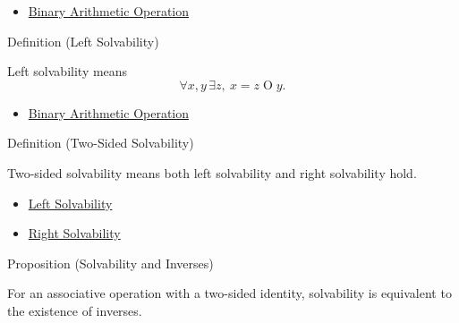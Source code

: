 \begin{dependencies}
\begin{itemize}
  \item \hyperref[def:binary-arithmetic-operation]{Binary Arithmetic Operation}
\end{itemize}
\end{dependencies}

\begin{definitionbox}{Definition (Left Solvability)}
\begin{definition}
\label{def:left-solvability}
Left solvability means
\[
\forall x,y\,\exists z,\ x=z\mathbin{O}y.
\]
\end{definition}
\end{definitionbox}

\begin{dependencies}
\begin{itemize}
  \item \hyperref[def:binary-arithmetic-operation]{Binary Arithmetic Operation}
\end{itemize}
\end{dependencies}

\begin{definitionbox}{Definition (Two-Sided Solvability)}
\begin{definition}
\label{def:two-sided-solvability}
Two-sided solvability means both left solvability and right solvability hold.
\end{definition}
\end{definitionbox}

\begin{dependencies}
\begin{itemize}
  \item \hyperref[def:left-solvability]{Left Solvability}
  \item \hyperref[def:right-solvability]{Right Solvability}
\end{itemize}
\end{dependencies}

\begin{propositionbox}{Proposition (Solvability and Inverses)}
\begin{proposition}
\label{prop:solvability-iff-inverses}
For an associative operation with a two-sided identity, solvability is
equivalent to the existence of inverses.
\end{proposition}
\end{propositionbox}

